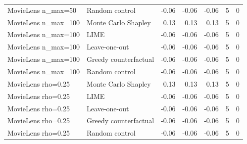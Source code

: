\begin{table}[t]
{\begin{tabular}{llrrrrr}
MovieLens n\_max=50 & Random control & -0.06 & -0.06 & -0.06 & 5 & 0 \\
MovieLens n\_max=100 & Monte Carlo Shapley & 0.13 & 0.13 & 0.13 & 5 & 0 \\
MovieLens n\_max=100 & LIME & -0.06 & -0.06 & -0.06 & 5 & 0 \\
MovieLens n\_max=100 & Leave-one-out & -0.06 & -0.06 & -0.06 & 5 & 0 \\
MovieLens n\_max=100 & Greedy counterfactual & -0.06 & -0.06 & -0.06 & 5 & 0 \\
MovieLens n\_max=100 & Random control & -0.06 & -0.06 & -0.06 & 5 & 0 \\
MovieLens rho=0.25 & Monte Carlo Shapley & 0.13 & 0.13 & 0.13 & 5 & 0 \\
MovieLens rho=0.25 & LIME & -0.06 & -0.06 & -0.06 & 5 & 0 \\
MovieLens rho=0.25 & Leave-one-out & -0.06 & -0.06 & -0.06 & 5 & 0 \\
MovieLens rho=0.25 & Greedy counterfactual & -0.06 & -0.06 & -0.06 & 5 & 0 \\
MovieLens rho=0.25 & Random control & -0.06 & -0.06 & -0.06 & 5 & 0 \\
\bottomrule
\end{tabular}
}
\end{table}
